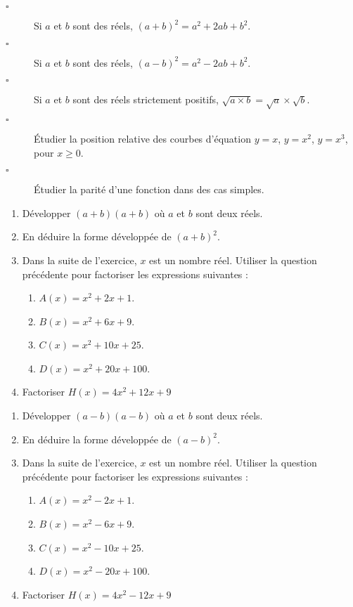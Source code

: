 \documentclass[10pt]{article}
\begin{document}
\begin{titre}

\end{titre}


\begin{CpsCol}
\begin{description}
\item[$\square$] Si $a$ et $b$ sont des réels, $(a+b)^2=a^2+2ab+b^2$.
\item[$\square$] Si $a$ et $b$ sont des réels, $(a-b)^2=a^2-2ab+b^2$.
\item[$\square$] Si $a$ et $b$ sont des réels strictement positifs, $\sqrt{a \times b} = \sqrt{a} \times \sqrt{b}$.
\item[$\square$] Étudier la position relative des courbes d’équation $y = x$, $y = x^2$, $y = x^3$, pour $x \geq 0$.
\item[$\square$] Étudier la parité d’une fonction dans des cas simples.
\end{description}
\end{CpsCol}




\begin{enumerate}
\item Développer $(a+b)(a+b)$ où $a$ et $b$ sont deux réels.
\item En déduire la forme développée de $(a+b)^2$. 
\item Dans la suite de l'exercice, $x$ est un nombre réel. Utiliser la question précédente pour factoriser les expressions suivantes : 
\begin{enumerate}
\item $A(x)=x^2+2x+1$.
\item $B(x)=x^2+6x+9$.
\item $C(x)=x^2+10x+25$.
\item $D(x)=x^2+20x+100$.
\end{enumerate}
\item Factoriser $H(x)=4x^2+12x+9$ 
\end{enumerate}
 


\begin{enumerate}
\item Développer $(a-b)(a-b)$ où $a$ et $b$ sont deux réels.
\item En déduire la forme développée de $(a-b)^2$. 
\item Dans la suite de l'exercice, $x$ est un nombre réel. Utiliser la question précédente pour factoriser les expressions suivantes : 
\begin{enumerate}
\item $A(x)=x^2-2x+1$.
\item $B(x)=x^2-6x+9$.
\item $C(x)=x^2-10x+25$.
\item $D(x)=x^2-20x+100$.
\end{enumerate}
\item Factoriser $H(x)=4x^2-12x+9$ 
\end{enumerate}
\end{document}
